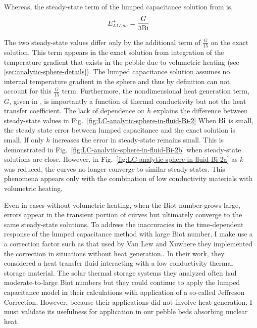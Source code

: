 Whereas, the steady-state term of the lumped capacitance solution from  is,
\begin{equation}
	E^*_{LG,ss} = \frac{G}{3\mathrm{Bi}}
\end{equation}

The two steady-state values differ only by the additional term of $\frac{G}{15}$ on the exact solution. This term appears in the exact solution from integration of the temperature gradient that exists in the pebble due to volumetric heating (see \cref{sec:analytic-sphere-details}). The lumped capacitance solution assumes no internal temperature gradient in the sphere and thus by definition can not account for this $\frac{G}{15}$ term. Furthermore, the nondimensional heat generation term, $G$, given in , is importantly a function of thermal conductivity but not the heat transfer coefficient. The lack of dependence on $h$ explains the difference between steady-state values in Fig.~\ref{fig:LC-analytic-sphere-in-fluid-Bi-2}  When $\mathrm{Bi}$ is small, the steady state error between lumped capacitance and the exact solution is small. If only $h$ increases the error in steady-state remains small. This is demonstrated in Fig.~\ref{fig:LC-analytic-sphere-in-fluid-Bi-2b} when steady-state solutions are close. However, in Fig.~\ref{fig:LC-analytic-sphere-in-fluid-Bi-2a} as $k$ was reduced, the curves no longer converge to similar steady-states. This phenomena appears only with the combination of low conductivity materials with volumetric heating.

Even in cases without volumetric heating, when the Biot number grows large, errors appear in the transient portion of curves but ultimately converge to the same steady-state solutions. To address the inaccuracies in the time-dependent response of the lumped capacitance method with large Biot number, I make use a a correction factor such as that used by Van Lew and Xu\etal where they implemented the correction in situations without heat generation.\cite{VanLew2010,Xu2012}. In their work, they considered a heat transfer fluid interacting with a low conductivity thermal storage material. The solar thermal storage systems they analyzed often had moderate-to-large Biot numbers but they could continue to apply the lumped capacitance model in their calculations with application of a so-called Jeffreson Correction.\cite{jeffreson409} However, because their applications did not involve heat generation, I must validate its usefulness for application in our pebble beds absorbing nuclear heat.





